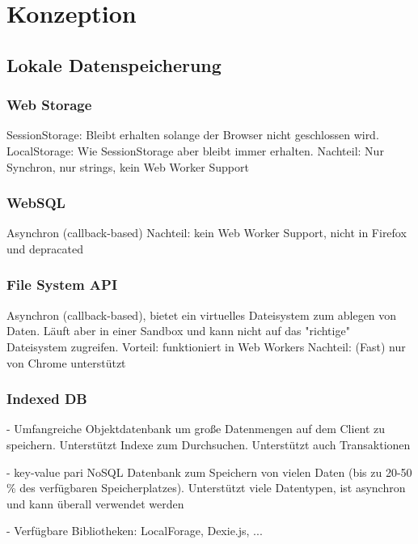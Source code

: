 \chapter{Konzeption}
\label{Kap4}

\section{Lokale Datenspeicherung}

\subsection{Web Storage}

SessionStorage: Bleibt erhalten solange der Browser nicht geschlossen wird.
LocalStorage: Wie SessionStorage aber bleibt immer erhalten.
Nachteil: Nur Synchron, nur strings, kein Web Worker Support
\cite{Hajian2019}

\subsection{WebSQL}

Asynchron (callback-based)
Nachteil: kein Web Worker Support, nicht in Firefox und depracated
\autocite{Hajian2019}

\subsection{File System API}

Asynchron (callback-based), bietet ein virtuelles Dateisystem zum ablegen von Daten. Läuft aber in einer Sandbox und kann nicht auf das "richtige" Dateisystem zugreifen.
Vorteil: funktioniert in Web Workers 
Nachteil: (Fast) nur von Chrome unterstützt
\autocite{Hajian2019}

\subsection{Indexed DB}

- Umfangreiche Objektdatenbank um große Datenmengen auf dem Client zu speichern. Unterstützt Indexe zum Durchsuchen. Unterstützt auch Transaktionen \autocite{Sheppard2017} 

- key-value pari NoSQL Datenbank zum Speichern von vielen Daten (bis zu 20-50 \% des verfügbaren Speicherplatzes). Unterstützt viele Datentypen, ist asynchron und kann überall verwendet werden \autocite{Hajian2019}

- Verfügbare Bibliotheken: LocalForage, Dexie.js, ... \autocite{Hajian2019}

